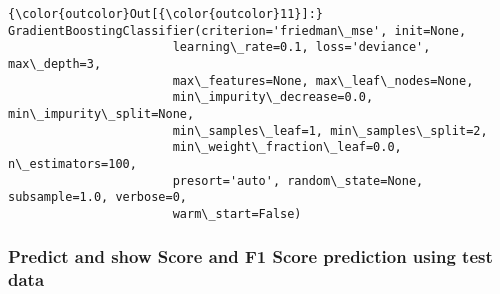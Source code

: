\documentclass[11pt]{article}
\begin{document}
\begin{Verbatim}[commandchars=\\\{\}]
{\color{outcolor}Out[{\color{outcolor}11}]:} GradientBoostingClassifier(criterion='friedman\_mse', init=None,
                       learning\_rate=0.1, loss='deviance', max\_depth=3,
                       max\_features=None, max\_leaf\_nodes=None,
                       min\_impurity\_decrease=0.0, min\_impurity\_split=None,
                       min\_samples\_leaf=1, min\_samples\_split=2,
                       min\_weight\_fraction\_leaf=0.0, n\_estimators=100,
                       presort='auto', random\_state=None, subsample=1.0, verbose=0,
                       warm\_start=False)
\end{Verbatim}
            
    \subsubsection{Predict and show Score and F1 Score prediction using test
data}\label{predict-and-show-score-and-f1-score-prediction-using-test-data}
\end{document}
